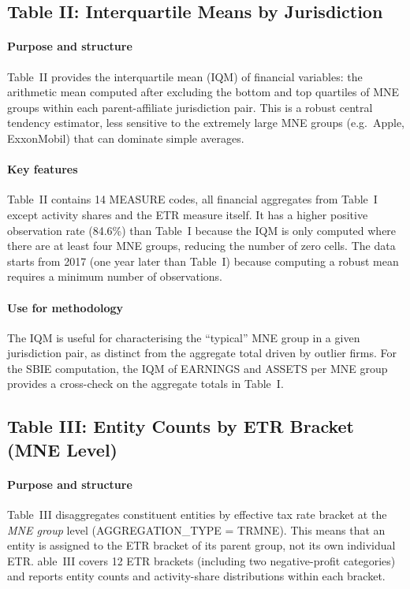 \documentclass[11pt,a4paper]{article}
\begin{document}
\subsection{Table II: Interquartile Means by Jurisdiction}\label{sec:table2}

\paragraph{Purpose and structure}
Table~II provides the interquartile mean (IQM) of financial variables: the arithmetic mean computed after excluding the bottom and top quartiles of MNE groups within each parent-affiliate jurisdiction pair. This is a robust central tendency estimator, less sensitive to the extremely large MNE groups (e.g.\ Apple, ExxonMobil) that can dominate simple averages.

\paragraph{Key features}
Table~II contains 14 MEASURE codes, all financial aggregates from Table~I except activity shares and the ETR measure itself. It has a higher positive observation rate (84.6\%) than Table~I because the IQM is only computed where there are at least four MNE groups, reducing the number of zero cells. The data starts from 2017 (one year later than Table~I) because computing a robust mean requires a minimum number of observations.

\paragraph{Use for methodology}
The IQM is useful for characterising the ``typical'' MNE group in a given jurisdiction pair, as distinct from the aggregate total driven by outlier firms. For the SBIE computation, the IQM of EARNINGS and ASSETS per MNE group provides a cross-check on the aggregate totals in Table~I. 

\subsection{Table III: Entity Counts by ETR Bracket (MNE Level)}\label{sec:table3}

\paragraph{Purpose and structure}
Table~III disaggregates constituent entities by effective tax rate bracket at the \emph{MNE group} level (AGGREGATION\_TYPE = TRMNE). This means that an entity is assigned to the ETR bracket of its parent group, not its own individual ETR.  able~III covers 12 ETR brackets (including two negative-profit categories) and reports entity counts and activity-share distributions within each bracket.
\end{document}

